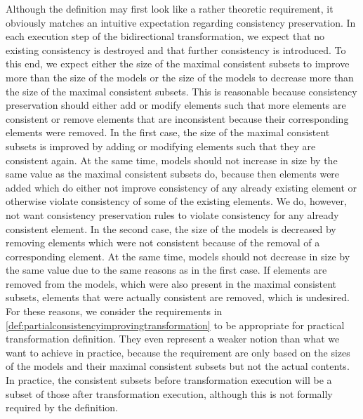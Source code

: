 Although the definition may first look like a rather theoretic requirement, it obviously matches an intuitive expectation regarding consistency preservation.
In each execution step of the bidirectional transformation, we expect that no existing consistency is destroyed and that further consistency is introduced.
To this end, we expect either the size of the maximal consistent subsets to improve more than the size of the models or the size of the models to decrease more than the size of the maximal consistent subsets.
This is reasonable because consistency preservation should either add or modify elements such that more elements are consistent or remove elements that are inconsistent because their corresponding elements were removed.
In the first case, the size of the maximal consistent subsets is improved by adding or modifying elements such that they are consistent again.
At the same time, models should not increase in size by the same value as the maximal consistent subsets do, because then elements were added which do either not improve consistency of any already existing element or otherwise violate consistency of some of the existing elements.
We do, however, not want consistency preservation rules to violate consistency for any already consistent element.
In the second case, the size of the models is decreased by removing elements which were not consistent because of the removal of a corresponding element.
At the same time, models should not decrease in size by the same value due to the same reasons as in the first case.
If elements are removed from the models, which were also present in the maximal consistent subsets, elements that were actually consistent are removed, which is undesired.
For these reasons, we consider the requirements in \autoref{def:partialconsistencyimprovingtransformation} to be appropriate for practical transformation definition.
They even represent a weaker notion than what we want to achieve in practice, because the requirement are only based on the sizes of the models and their maximal consistent subsets but not the actual contents.
In practice, the consistent subsets before transformation execution will be a subset of those after transformation execution, although this is not formally required by the definition.

